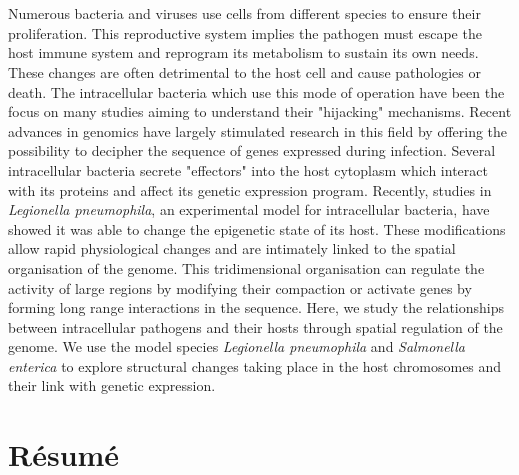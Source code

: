 %
\chapter*{\abstractname}
\label{sec:abstract}
\vspace*{-10mm}

Numerous bacteria and viruses use cells from different species to ensure their proliferation. This reproductive system implies the pathogen must escape the host immune system and reprogram its metabolism to sustain its own needs. These changes are often detrimental to the host cell and cause pathologies or death. The intracellular bacteria which use this mode of operation have been the focus on many studies aiming to understand their "hijacking" mechanisms. Recent advances in genomics have largely stimulated research in this field by offering the possibility to decipher the sequence of genes expressed during infection. Several intracellular bacteria secrete "effectors" into the host cytoplasm which interact with its proteins and affect its genetic expression program. Recently, studies in \textit{Legionella pneumophila}, an experimental model for intracellular bacteria, have showed it was able to change the epigenetic state of its host. These modifications allow rapid physiological changes and are intimately linked to the spatial organisation of the genome. This tridimensional organisation can regulate the activity of large regions by modifying their compaction or activate genes by forming long range interactions in the sequence. Here, we study the relationships between intracellular pathogens and their hosts through spatial regulation of the genome. We use the model species \textit{Legionella pneumophila} and \textit{Salmonella enterica} to explore structural changes taking place in the host chromosomes and their link with genetic expression.

\vspace*{20mm}

\chapter*{Résumé}
\label{sec:abstract-diff}


